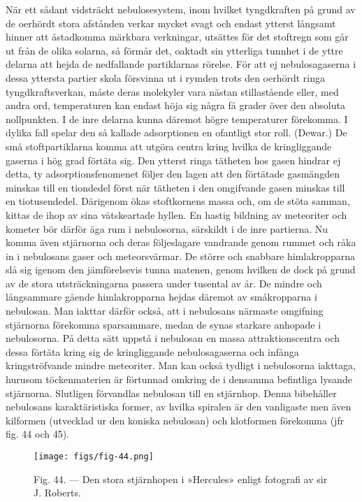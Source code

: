 \documentclass[a4paper, 12pt, oneside, swedish]{article}
\begin{document}
När ett sådant vidsträckt nebulosesystem, inom hvilket tyngdkraften på grund av de oerhördt stora afstånden verkar mycket svagt och endast ytterst långsamt hinner att åstadkomma märkbara verkningar, utsättes för det stoftregn som går ut från de olika solarna, så förmår det, oaktadt sin ytterliga tunnhet i de yttre delarna att hejda de nedfallande partiklarnas rörelse. För att ej nebulosagaserna i dessa yttersta partier skola försvinna ut i rymden trots den oerhördt ringa tyngdkraftsverkan, måste deras molekyler vara nästan stillastående eller, med andra ord, temperaturen kan endast höja sig några få grader över den absoluta nollpunkten. I de inre delarna kunna däremot högre temperaturer förekomma. I dylika fall spelar den så kallade adsorptionen en ofantligt stor roll. (Dewar.) De små stoftpartiklarna komma att utgöra centra kring hvilka de kringliggande gaserna i hög grad förtäta sig. Den ytterst ringa tätheten hos gasen hindrar ej detta, ty adsorptionsfenomenet följer den lagen att den förtätade gasmängden minskas till en tiondedel först när tätheten i den omgifvande gasen minskas till en tiotusendedel. Därigenom ökas stoftkornens massa och, om de stöta samman, kittas de ihop av sina vätskeartade hyllen. En hastig bildning av meteoriter och kometer bör därför äga rum i nebulosorna, särskildt i de inre partierna. Nu komma även stjärnorna och deras följeslagare vandrande genom rummet och råka in i nebulosans gaser och meteorsvärmar. De större och snabbare himlakropparna slå sig igenom den jämförelsevis tunna matenen, genom hvilken de dock på grund av de stora utsträckningarna passera under tusental av år. De mindre och långsammare gående himlakropparna hejdas däremot av småkropparna i nebulosan. Man iakttar därför också, att i nebulosans närmaste omgifning stjärnorna förekomma sparsammare, medan de synas starkare anhopade i nebulosorna. På detta sätt uppstå i nebulosan en massa attraktionscentra och dessa förtäta kring sig de kringliggande nebulosagaserna och infånga kringströfvande mindre meteoriter. Man kan också tydligt i nebulosorna iakttaga, hurusom töckenmaterien är förtunnad omkring de i densamma befintliga lysande stjärnorna. Slutligen förvandlas nebulosan till en stjärnhop. Denna bibehåller nebulosans karaktäristiska former, av hvilka spiralen är den vanligaste men även kilformen (utvecklad ur den koniska nebulosan) och klotformen förekomma (jfr fig. 44 och 45).

\begin{figure}[H]
\centering
\texttt{[image: figs/fig-44.png]}
\caption{Fig. 44. --- Den stora stjärnhopen i »Hercules» enligt fotografi av sir J. Roberts.}
\end{figure}
\end{document}
